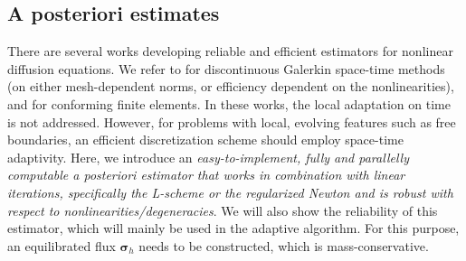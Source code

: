 \documentclass[review,11pt]{article}
\numberwithin{equation}{section}
\def \f  {\varphi}
\def \Om {\Omega}
\def \t  {\tau}
\def \p  {\partial}
\def \calV {\mathcal{V}}
\def \calR {\mathcal{R}}
\def \resH {{\calR}_{\mathrm{H}}}
\begin{document}

\subsection{A posteriori estimates}\label{sec:a-posteriori}
There are several works developing reliable and efficient estimators for nonlinear diffusion equations. We refer to \cite{dolejvsi2024error,congreve2026residual,DolejsiRoskovec2021} for discontinuous Galerkin space-time methods (on either mesh-dependent norms, or efficiency dependent on the nonlinearities), and \cite{ErnSmearsVohralik2017,ErnSmearsVohralik2019} for conforming finite elements. In these works, the local adaptation on time is not addressed. However, for problems with local, evolving features such as free boundaries, an efficient discretization scheme should employ space-time adaptivity. Here, we introduce an \emph{easy-to-implement, fully and parallelly computable a posteriori estimator that works in combination with linear iterations, specifically the L-scheme or the regularized Newton and is robust with respect to nonlinearities/degeneracies}. We will also show the reliability of this estimator, which will mainly be used in the adaptive algorithm. For this purpose, an equilibrated flux $\bm{\sigma}_h$ needs to be constructed, which is mass-conservative. 
\end{document}
